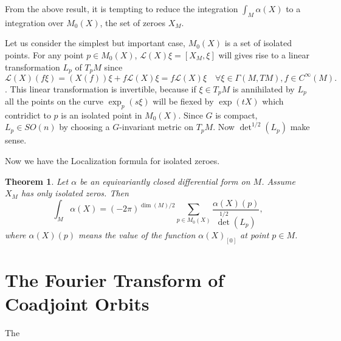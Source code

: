\documentclass[11pt]{amsart}
\newtheorem{Thm}{Theorem}
\def\cL{{\mathcal{L}}}
\begin{document}
From the above result, it is tempting to reduce the integration
$\int_M\alpha(X)$ to a integration over $M_0(X)$, the set of zeroes $X_M$.

Let us consider the simplest but important case, $M_0(X)$ is a set of
isolated points.
For any point $p\in M_0(X)$,
$\cL(X)\xi = [X_M,\xi]$ will gives rise to a linear
transformation $L_p$ of $T_pM$ since 
\[\cL(X)(f\xi) = (X(f))\xi + f\cL(X)\xi = f\cL(X)\xi \quad \forall \xi
\in \Gamma(M,TM), f\in C^\infty(M).
\]. This linear transformation is invertible, because if $\xi\in T_pM$ is
annihilated by $L_p$ all the  points on the curve $\exp_p(s\xi)$ will
be fiexed by $\exp(tX)$ which contridict to  $p$ is an isolated point
in $M_0(X)$.
Since $G$ is compact, $L_p\in SO(n)$ by choosing a $G$-invariant
metric on $T_pM$. Now $\det^{1/2} (L_p)$ make sense.

Now we have the Localization formula for isolated zeroes.
  
\begin{Thm} Let $\alpha$ be an equivariantly closed differential form
  on $M$. Assume $X_M$ has only isolated zeros. Then
\[
\int_M \alpha(X) = (-2\pi)^{\dim(M)/2}\sum_{p\in M_0(X)}\frac{\alpha(X)(p)}{\det^{1/2}(L_p)},
\]
where $\alpha(X)(p)$ means the value of the function $\alpha(X)_{[0]}$
at point $p\in M$.
\end{Thm}

\section{The Fourier Transform of Coadjoint Orbits}
The 
\end{document}
